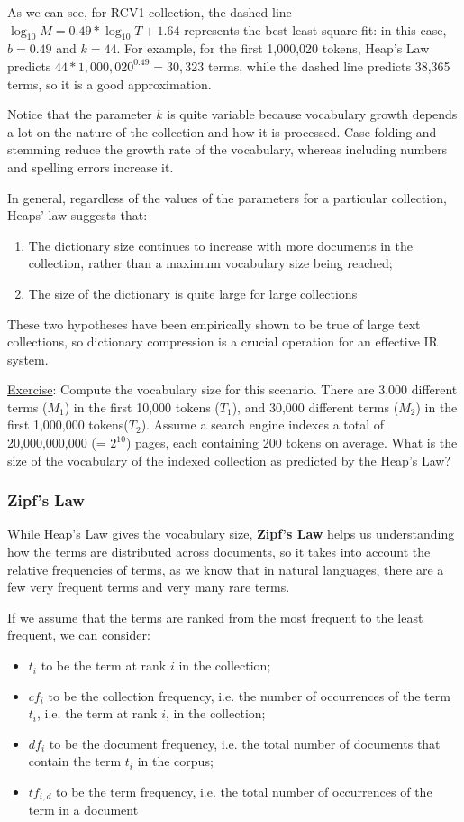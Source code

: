 As we can see, for RCV1 collection, the dashed line $\log_{10}M = 0.49 * \log_{10} T + 1.64$ represents the best least-square fit: in this case, $b = 0.49$ and $k = 44$. For example, for the first 1,000,020 tokens, Heap's Law predicts $44 * 1,000,020^{0.49} = 30,323$ terms, while the dashed line predicts 38,365 terms, so it is a good approximation.

Notice that the parameter $k$ is quite variable because vocabulary growth depends a lot on the nature of the collection and how it is processed. Case-folding and stemming reduce the growth rate of the vocabulary, whereas including numbers and spelling errors increase it.

In general, regardless of the values of the parameters for a particular collection, Heaps’ law suggests that:

\begin{enumerate}
    \item The dictionary size continues to increase with more documents in the collection, rather than a maximum vocabulary size being reached;
    \item The size of the dictionary is quite large for large collections
\end{enumerate}

These two hypotheses have been empirically shown to be true of large text collections, so dictionary compression is a crucial operation for an effective IR system.

\underline{Exercise}: Compute the vocabulary size for this scenario. There are 3,000 different terms ($M_1$) in the first 10,000 tokens ($T_1$), and 30,000 different terms ($M_2$) in the first 1,000,000 tokens($T_2$). Assume a search engine indexes a total of 20,000,000,000 (= $2^{10}$) pages, each containing 200 tokens on average. What is the size of the vocabulary of the indexed collection as predicted by the Heap's Law? 

\subsubsection{Zipf's Law}
While Heap's Law gives the vocabulary size, \textbf{Zipf's Law} helps us understanding how the terms are distributed across documents, so it takes into account the relative frequencies of terms, as we know that in natural languages, there are a few very frequent terms and very many rare terms.

If we assume that the terms are ranked from the most frequent to the least frequent, we can consider:
\begin{itemize}
    \item $t_i$ to be the term at rank $i$ in the collection;
    \item $cf_i$ to be the collection frequency, i.e. the number of occurrences of the term $t_i$, i.e. the term at rank $i$, in the collection;
    \item $df_i$ to be the document frequency, i.e. the total number of documents that contain the term $t_i$ in the corpus;
    \item $tf_{i,d}$ to be the term frequency, i.e. the total number of occurrences of the term in a document
\end{itemize}


